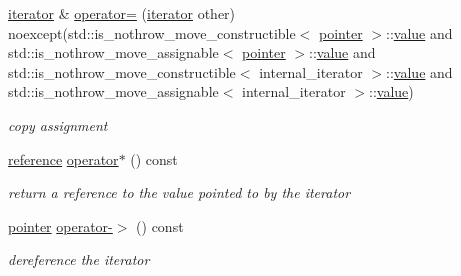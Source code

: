 \begin{DoxyCompactItemize}
\hyperlink{classnlohmann_1_1basic__json_1_1iterator}{iterator} \& \hyperlink{classnlohmann_1_1basic__json_1_1iterator_a51b0ed345317cfd1b2386f481d774477}{operator=} (\hyperlink{classnlohmann_1_1basic__json_1_1iterator}{iterator} other) noexcept(std\+::is\+\_\+nothrow\+\_\+move\+\_\+constructible$<$ \hyperlink{classnlohmann_1_1basic__json_1_1const__iterator_a1da96fc3054d547e7706d3a2f073f389}{pointer} $>$\+::\hyperlink{classnlohmann_1_1basic__json_1_1iterator_ac688806417f3b4e17c4eb1b661b522f1}{value} and std\+::is\+\_\+nothrow\+\_\+move\+\_\+assignable$<$ \hyperlink{classnlohmann_1_1basic__json_1_1const__iterator_a1da96fc3054d547e7706d3a2f073f389}{pointer} $>$\+::\hyperlink{classnlohmann_1_1basic__json_1_1iterator_ac688806417f3b4e17c4eb1b661b522f1}{value} and std\+::is\+\_\+nothrow\+\_\+move\+\_\+constructible$<$ internal\+\_\+iterator $>$\+::\hyperlink{classnlohmann_1_1basic__json_1_1iterator_ac688806417f3b4e17c4eb1b661b522f1}{value} and std\+::is\+\_\+nothrow\+\_\+move\+\_\+assignable$<$ internal\+\_\+iterator $>$\+::\hyperlink{classnlohmann_1_1basic__json_1_1iterator_ac688806417f3b4e17c4eb1b661b522f1}{value})
\begin{DoxyCompactList}\small\item\em copy assignment \end{DoxyCompactList}\item 
\mbox{\label{classnlohmann_1_1basic__json_1_1iterator_a1af28ba60302eb48edf4fdbc88e75903}} 
\hyperlink{classnlohmann_1_1basic__json_1_1const__iterator_aefd248cac6493eed1e6ff53ba6a63eb2}{reference} \hyperlink{classnlohmann_1_1basic__json_1_1iterator_a1af28ba60302eb48edf4fdbc88e75903}{operator$\ast$} () const
\begin{DoxyCompactList}\small\item\em return a reference to the value pointed to by the iterator \end{DoxyCompactList}\item 
\mbox{\label{classnlohmann_1_1basic__json_1_1iterator_a12c7f8236ffa08a5dd27cbd9888b74be}} 
\hyperlink{classnlohmann_1_1basic__json_1_1const__iterator_a1da96fc3054d547e7706d3a2f073f389}{pointer} \hyperlink{classnlohmann_1_1basic__json_1_1iterator_a12c7f8236ffa08a5dd27cbd9888b74be}{operator-\/$>$} () const
\begin{DoxyCompactList}\small\item\em dereference the iterator \end{DoxyCompactList}\item 

\end{DoxyCompactItemize}
